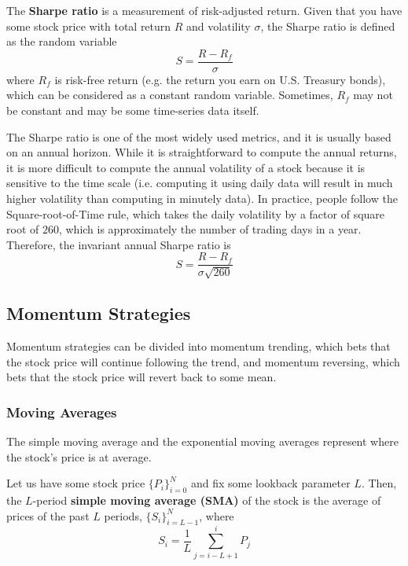 \documentclass{article}
\begin{document}
\begin{definition}
The \textbf{Sharpe ratio} is a measurement of risk-adjusted return. Given that you have some stock price with total return $R$ and volatility $\sigma$, the Sharpe ratio is defined as the random variable
\[S = \frac{R - R_f}{\sigma}\]
where $R_f$ is risk-free return (e.g. the return you earn on U.S. Treasury bonds), which can be considered as a constant random variable. Sometimes, $R_f$ may not be constant and may be some time-series data itself. 
\end{definition}

The Sharpe ratio is one of the most widely used metrics, and it is usually based on an annual horizon. While it is straightforward to compute the annual returns, it is more difficult to compute the annual volatility of a stock because it is sensitive to the time scale (i.e. computing it using daily data will result in much higher volatility than computing in minutely data). In practice, people follow the Square-root-of-Time rule, which takes the daily volatility by a factor of square root of $260$, which is approximately the number of trading days in a year. Therefore, the invariant annual Sharpe ratio is 
\[S = \frac{R - R_f}{\sigma \sqrt{260}}\]


\subsection{Momentum Strategies}

Momentum strategies can be divided into momentum trending, which bets that the stock price will continue following the trend, and momentum reversing, which bets that the stock price will revert back to some mean. 
\subsubsection{Moving Averages}

The simple moving average and the exponential moving averages represent where the stock's price is at average. 

\begin{definition}
Let us have some stock price $\{P_i\}_{i=0}^N$ and fix some lookback parameter $L$. Then, the $L$-period \textbf{simple moving average (SMA)} of the stock is the average of prices of the past $L$ periods, $\{S_i\}_{i=L-1}^N$, where 
\[S_i = \frac{1}{L} \sum_{j=i-L + 1}^i P_j\]
\end{definition}
\end{document}
